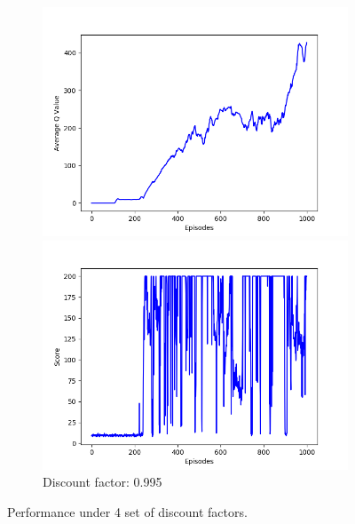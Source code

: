 \documentclass{article}
\begin{document}
\begin{figure}[!htbp]
  \begin{subfigure}{\textwidth}
    \begin{minipage}{0.5\textwidth}
      \centering
      \includegraphics[scale=0.45]{../experiments/discount_factor_0995/qvalues.png}
    \end{minipage}
    \begin{minipage}{0.5\textwidth}
      \centering
      \includegraphics[scale=0.45]{../experiments/discount_factor_0995/scores.png}
    \end{minipage}
    \caption{Discount factor: 0.995}
  \end{subfigure}%

  \caption{Performance under 4 set of discount factors.}
  \label{discount factor}
\end{figure}
\end{document}
